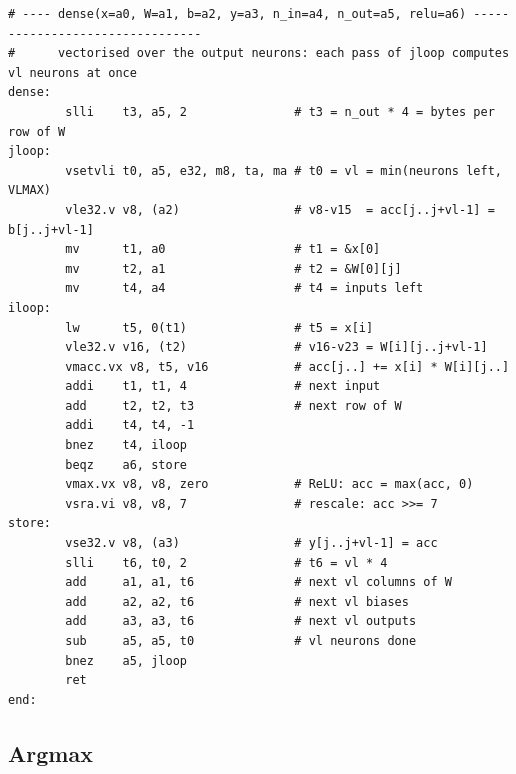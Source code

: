 \documentclass[11pt,a4paper]{article}
\begin{document}
\begin{lstlisting}[style=asm]
# ---- dense(x=a0, W=a1, b=a2, y=a3, n_in=a4, n_out=a5, relu=a6) --------------------------------
#      vectorised over the output neurons: each pass of jloop computes vl neurons at once
dense:
        slli    t3, a5, 2               # t3 = n_out * 4 = bytes per row of W
jloop:
        vsetvli t0, a5, e32, m8, ta, ma # t0 = vl = min(neurons left, VLMAX)
        vle32.v v8, (a2)                # v8-v15  = acc[j..j+vl-1] = b[j..j+vl-1]
        mv      t1, a0                  # t1 = &x[0]
        mv      t2, a1                  # t2 = &W[0][j]
        mv      t4, a4                  # t4 = inputs left
iloop:
        lw      t5, 0(t1)               # t5 = x[i]
        vle32.v v16, (t2)               # v16-v23 = W[i][j..j+vl-1]
        vmacc.vx v8, t5, v16            # acc[j..] += x[i] * W[i][j..]
        addi    t1, t1, 4               # next input
        add     t2, t2, t3              # next row of W
        addi    t4, t4, -1
        bnez    t4, iloop
        beqz    a6, store
        vmax.vx v8, v8, zero            # ReLU: acc = max(acc, 0)
        vsra.vi v8, v8, 7               # rescale: acc >>= 7
store:
        vse32.v v8, (a3)                # y[j..j+vl-1] = acc
        slli    t6, t0, 2               # t6 = vl * 4
        add     a1, a1, t6              # next vl columns of W
        add     a2, a2, t6              # next vl biases
        add     a3, a3, t6              # next vl outputs
        sub     a5, a5, t0              # vl neurons done
        bnez    a5, jloop
        ret
end:
\end{lstlisting}

\subsection{Argmax}
\end{document}
